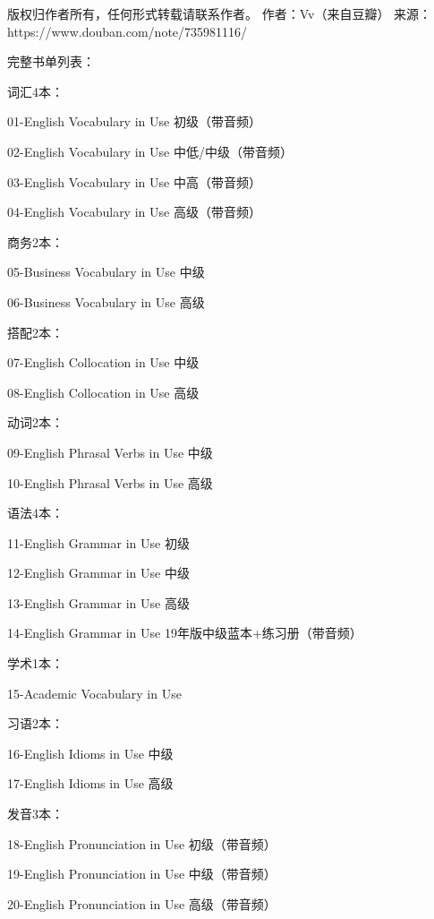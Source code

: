 版权归作者所有，任何形式转载请联系作者。
作者：Vv（来自豆瓣）
来源：https://www.douban.com/note/735981116/

完整书单列表：

词汇4本：

01-English Vocabulary in Use 初级（带音频）

02-English Vocabulary in Use 中低/中级（带音频）

03-English Vocabulary in Use 中高（带音频）

04-English Vocabulary in Use 高级（带音频）

商务2本：

05-Business Vocabulary in Use 中级

06-Business Vocabulary in Use 高级

搭配2本：

07-English Collocation in Use 中级

08-English Collocation in Use 高级

动词2本：

09-English Phrasal Verbs in Use 中级

10-English Phrasal Verbs in Use 高级

语法4本：

11-English Grammar in Use 初级

12-English Grammar in Use 中级

13-English Grammar in Use 高级

14-English Grammar in Use  19年版中级蓝本+练习册（带音频）

学术1本：

15-Academic Vocabulary in Use

习语2本：

16-English Idioms in Use 中级

17-English Idioms in Use 高级

发音3本：

18-English Pronunciation in Use 初级（带音频）

19-English Pronunciation in Use 中级（带音频）

20-English Pronunciation in Use 高级（带音频）